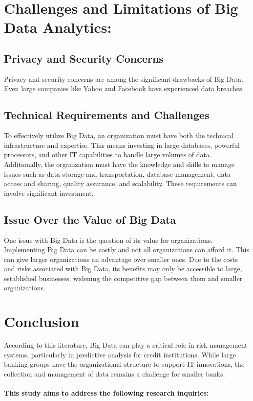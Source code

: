 \section{Challenges and Limitations of Big Data Analytics:}
\subsection{Privacy and Security Concerns}

Privacy and security concerns are among the significant drawbacks of Big Data. Even large companies like Yahoo
and Facebook have experienced data breaches. 

\subsection{Technical Requirements and Challenges}

To effectively utilize Big Data, an organization must have both the technical infrastructure and expertise. This
means investing in large databases, powerful processors, and other IT capabilities to handle large volumes of data.
Additionally, the organization must have the knowledge and skills to manage issues such as data storage and
transportation, database management, data access and sharing, quality assurance, and scalability. These
requirements can involve significant investment.

\subsection{Issue Over the Value of Big Data}

One issue with Big Data is the question of its value for organizations. Implementing Big Data can be costly and not
all organizations can afford it. This can give larger organizations an advantage over smaller ones. Due to the
costs and risks associated with Big Data, its benefits may only be accessible to large, established businesses,
widening the competitive gap between them and smaller organizations.

\section{Conclusion}
According to this literature, Big Data can play a critical role in risk management systems, particularly in
predictive analysis for credit institutions. While large banking groups have the organizational structure to
support IT innovations, the collection and management of data remains a challenge for smaller banks.\\\\
\textbf{This study aims to address the following research inquiries:}

